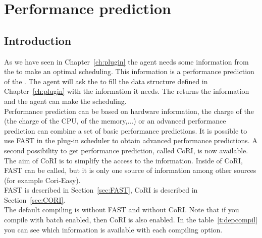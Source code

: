 
\chapter{Performance prediction}
\label{chapter:performance}
\section{Introduction}

As we have seen in Chapter~\ref{ch:plugin} the agent needs some
information from the \sed to make an optimal scheduling. This
information is a performance prediction of the \sed. The agent will ask
the \sed to fill the data structure defined in Chapter~\ref{ch:plugin}
with the information it needs. The \sed returns the information and the
agent can make the scheduling. \\ Performance prediction can be based
on hardware information, the charge of the \sed (the charge of the CPU,
of the memory,...) or an advanced performance prediction can combine
a set of basic performance predictions. It is possible to use FAST in
the plug-in scheduler to obtain advanced performance predictions. A
second possibility to get performance prediction, called CoRI, is now
available.  The aim of CoRI is to simplify the access to the
information. Inside of CoRI, FAST can be called, but it is only one
source of information among other sources (for example Cori-Easy). \\
FAST is described in Section~\ref{sec:FAST}, CoRI is described in
Section~\ref{sec:CORI}.\\ The default compiling is without FAST and
without CoRI. Note that if you compile with batch enabled, then CoRI
is also enabled.  In the table~\ref{t:depcompil} you can see which
information is available with each compiling option.

